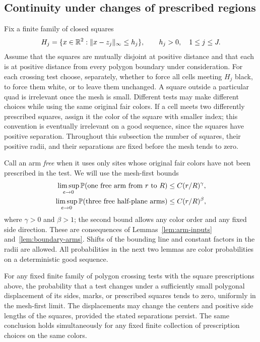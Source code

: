 \subsection{Continuity under changes of prescribed regions}
\label{subsec:forced-continuity}

Fix a finite family of closed squares
\[
 H_j=\{x\in\mathbb R^2:\|x-z_j\|_\infty\le h_j\},\qquad h_j>0,
 \quad 1\le j\le J.
\]
Assume that the squares are mutually disjoint at positive distance and that
each is at positive distance from every polygon boundary under consideration.
For each crossing test choose, separately, whether to force all cells meeting
$H_j$ black, to force them white, or to leave them unchanged. A square outside
a particular quad is irrelevant once the mesh is small. Different tests may
make different choices while using the same original fair colors. If a cell meets two differently prescribed squares, assign it the color of
the square with smaller index; this convention is eventually irrelevant on
a good sequence, since the squares have positive separation. Throughout
this subsection the number of squares, their positive radii, and their
separations are fixed before the mesh tends to zero.

Call an arm \emph{free} when it uses only sites whose original fair colors
have not been prescribed in the test. We will use the mesh-first bounds
\begin{equation}\label{eq:forced-arm-bounds}
\begin{aligned}
 \limsup_{e\to0}\mathbb P(\hbox{one free arm from }r\hbox{ to }R)
       &\le C(r/R)^\gamma,\\
 \limsup_{e\to0}\mathbb P(\hbox{three free half-plane arms})
       &\le C(r/R)^\beta,
\end{aligned}
\end{equation}
where $\gamma>0$ and $\beta>1$; the second bound allows any color order and
any fixed side direction. These are consequences of
Lemmas~\ref{lem:arm-inputs} and~\ref{lem:boundary-arms}. Shifts of the bounding
line and constant factors in the radii are allowed. All probabilities in the
next two lemmas are color probabilities on a deterministic good sequence.

\begin{lemma}
\label{lem:forced-continuity}
For any fixed finite family of polygon crossing tests with the square
prescriptions above, the probability that a test changes under a sufficiently
small polygonal displacement of its sides, marks, or prescribed squares tends
to zero, uniformly in the mesh-first limit. The displacements may change the
centers and positive side lengths of the squares, provided the stated
separations persist. The same conclusion holds simultaneously for any fixed
finite collection of prescription choices on the same colors.
\end{lemma}


